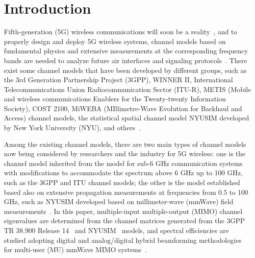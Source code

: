 \documentclass[journal]{IEEEtran}
\begin{document}
\IEEEpeerreviewmaketitle
\section{Introduction}
Fifth-generation (5G) wireless communications will soon be a reality~\cite{Rap13:Access}, and to properly design and deploy 5G wireless systems, channel models based on fundamental physics and extensive measurements at the corresponding frequency bands are needed to analyze future air interfaces and signaling protocols~\cite{Rap_5GTech}. There exist some channel models that have been developed by different groups, such as the 3rd Generation Partnership Project (3GPP), WINNER II, International Telecommunications Union Radiocommunication Sector (ITU-R), METIS (Mobile and wireless communications Enablers for the Twenty-twenty Information Society), COST 2100, MiWEBA (MIllimetre-Wave Evolution for Backhaul and Access) channel models, the statistical spatial channel model NYUSIM developed by New York University (NYU), and others~\cite{3GPP_Dec,Ertel}. 


Among the existing channel models, there are two main types of channel models now being considered by researchers and the industry for 5G wireless: one is the channel model inherited from the model for sub-6 GHz communication systems with modifications to accommodate the spectrum above 6 GHz up to 100 GHz, such as the 3GPP and ITU channel models; the other is the model established based also on extensive propagation measurements at frequencies from 0.5 to 100 GHz, such as NYUSIM developed based on millimeter-wave (mmWave) field measurements~\cite{Rap13:Access,Rap15:TCOM,Samimi15:MTT,Samimi16_Local,Sun17_NYUSIM,Sun16:TVT,Tho16,Mac15_Indoor,Mac17_RMa}. In this paper, multiple-input multiple-output (MIMO) channel eigenvalues are determined from the channel matrices generated from the 3GPP TR 38.900 Release 14~\cite{3GPP_Dec} and NYUSIM~\cite{Samimi15:MTT,Sun17_NYUSIM} models, and spectral efficiencies are studied adopting digital and analog/digital hybrid beamforming methodologies for multi-user (MU) mmWave MIMO systems~\cite{Alk15,Spencer04,Sun17_ICCW}.
\end{document}
